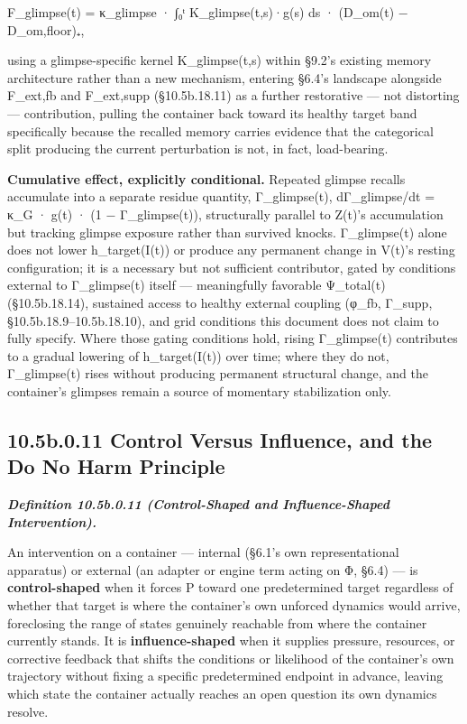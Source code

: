 \documentclass[
]{article}
\begin{document}
F\_glimpse(t) = κ\_glimpse · ∫₀ᵗ K\_glimpse(t,s)·g(s) ds · (D\_om(t) −
D\_om,floor)₊,

using a glimpse-specific kernel K\_glimpse(t,s) within §9.2's existing
memory architecture rather than a new mechanism, entering §6.4's
landscape alongside F\_ext,fb and F\_ext,supp (§10.5b.18.11) as a
further restorative --- not distorting --- contribution, pulling the
container back toward its healthy target band specifically because the
recalled memory carries evidence that the categorical split producing
the current perturbation is not, in fact, load-bearing.

\textbf{Cumulative effect, explicitly conditional.} Repeated glimpse
recalls accumulate into a separate residue quantity, Γ\_glimpse(t),
dΓ\_glimpse/dt = κ\_G · g(t) · (1 − Γ\_glimpse(t)), structurally
parallel to Z(t)'s accumulation but tracking glimpse exposure rather
than survived knocks. Γ\_glimpse(t) alone does not lower h\_target(I(t))
or produce any permanent change in V(t)'s resting configuration; it is a
necessary but not sufficient contributor, gated by conditions external
to Γ\_glimpse(t) itself --- meaningfully favorable Ψ\_total(t)
(§10.5b.18.14), sustained access to healthy external coupling (φ\_fb,
Γ\_supp, §10.5b.18.9--10.5b.18.10), and grid conditions this document
does not claim to fully specify. Where those gating conditions hold,
rising Γ\_glimpse(t) contributes to a gradual lowering of
h\_target(I(t)) over time; where they do not, Γ\_glimpse(t) rises
without producing permanent structural change, and the container's
glimpses remain a source of momentary stabilization only.

\hypertarget{b.0.11-control-versus-influence-and-the-do-no-harm-principle}{%
\subsection{10.5b.0.11 Control Versus Influence, and the Do No Harm
Principle}\label{b.0.11-control-versus-influence-and-the-do-no-harm-principle}}

\emph{\textbf{Definition 10.5b.0.11 (Control-Shaped and Influence-Shaped
Intervention).}}

An intervention on a container --- internal (§6.1's own representational
apparatus) or external (an adapter or engine term acting on Φ, §6.4) ---
is \textbf{control-shaped} when it forces P toward one predetermined
target regardless of whether that target is where the container's own
unforced dynamics would arrive, foreclosing the range of states
genuinely reachable from where the container currently stands. It is
\textbf{influence-shaped} when it supplies pressure, resources, or
corrective feedback that shifts the conditions or likelihood of the
container's own trajectory without fixing a specific predetermined
endpoint in advance, leaving which state the container actually reaches
an open question its own dynamics resolve.
\end{document}
